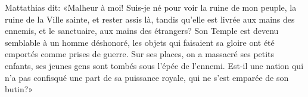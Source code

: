 Mattathias dit: «Malheur à moi!
	Suis-je né pour voir la ruine de mon peuple, la ruine de la Ville sainte,
	et rester assis là, tandis qu’elle est livrée aux mains des ennemis,
	et le sanctuaire, aux mains des étrangers?
Son Temple est devenu semblable à un homme déshonoré,
	les objets qui faisaient sa gloire ont été emportés comme prises de guerre.
Sur ses places, on a massacré ses petits enfants,
	ses jeunes gens sont tombés sous l’épée de l’ennemi.
Est-il une nation qui n’a pas confisqué une part de sa puissance royale,
	qui ne s’est emparée de son butin?»

